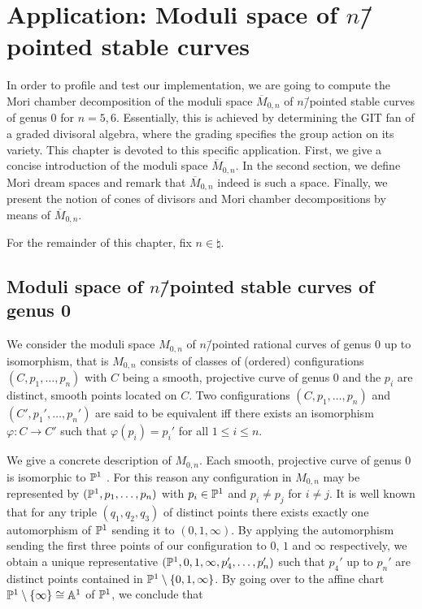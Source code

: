 \chapter{Application: Moduli space of $n$\=/pointed stable curves}
\label{chapter:moduli_space_of_pointed_stable_curves}

In order to profile and test our implementation, we are going to compute the Mori chamber decomposition of the moduli space $\overline{M}_{0,n}$ of $n$\=/pointed stable curves of genus $0$ for $n=5,6$. Essentially, this is achieved by determining the GIT fan of a graded divisoral algebra, where the grading specifies the group action on its variety. This chapter is devoted to this specific application. First, we give a concise introduction of the moduli space $\overline{M}_{0,n}$. In the second section, we define Mori dream spaces and remark that $\overline{M}_{0,n}$ indeed is such a space. Finally, we present the notion of cones of divisors and Mori chamber decompositions by means of $\overline{M}_{0,n}$.

For the remainder of this chapter, fix $n\in\natural$.

\section{Moduli space of $n$\=/pointed stable curves of genus 0}

We consider the moduli space $M_{0,n}$ of $n$\=/pointed rational curves of genus $0$ up to isomorphism, that is $M_{0,n}$ consists of classes of (ordered) configurations $(C,p_1,\dots,p_n)$ with $C$ being a smooth, projective curve of genus $0$ and the $p_i$ are distinct, smooth points located on $C$. Two configurations $(C,p_1,\dots,p_n)$ and $(C',p_1',\dots,p_n')$ are said to be equivalent iff there exists an isomorphism $\varphi: C \longrightarrow C'$ such that $\varphi(p_i) = p_i'$ for all $1\leq i \leq n$.
%

We give a concrete description of $M_{0,n}$. Each smooth, projective curve of genus $0$ is isomorphic to $\mathbb{P}^1$ \cite[Example IV.1.3.5]{hartshorne}. For this reason any configuration in $M_{0,n}$ may be represented by $(\mathbb{P}^1, p_1,\dots,p_n)$ with $p_i\in \mathbb{P}^1$ and $p_i \neq p_j$ for $i\neq j$. It is well known that for any triple $(q_1, q_2, q_3)$ of distinct points there exists exactly one automorphism of $\mathbb{P}^1$ sending it to $(0,1,\infty)$. By applying the automorphism sending the first three points of our configuration to $0$, $1$ and $\infty$ respectively, we obtain a unique representative $(\mathbb{P}^1, 0, 1, \infty, p_4',\dots,p_n')$ such that $p_4'$ up to $p_n'$ are distinct points contained in $\mathbb{P}^1\setminus\{0,1,\infty\}$. By going over to the affine chart $\mathbb{P}^1\setminus\{\infty\}\cong \mathbb{A}^1$ of $\mathbb{P}^1$, we conclude that

